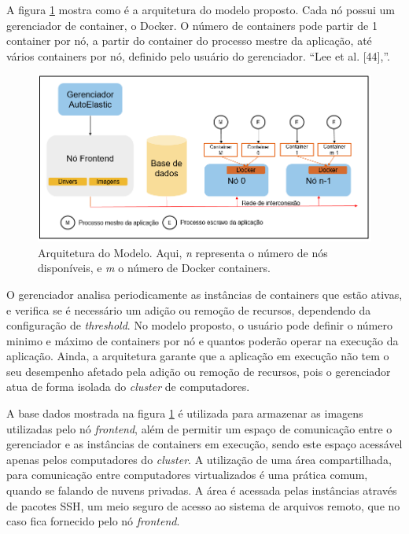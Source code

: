 \documentclass[twoside,english,brazilian]{UNISINOSartigo}
\begin{document}
A figura \ref{fig:arquitetura} mostra como é a arquitetura do modelo proposto. Cada nó possui um gerenciador de container, o Docker. O número de containers pode partir de 1 container por nó, a partir do container do processo mestre da aplicação, até vários containers por nó, definido pelo usuário do gerenciador. ``Lee
et al. [44],''.  

\begin{figure}
	\caption{Arquitetura do Modelo. Aqui, \textit{n} representa o número de nós disponíveis, e \textit{m} o número de Docker containers.}
	\label{fig:arquitetura}
	\centering%
	\begin{minipage}{0.8\textwidth}
		\includegraphics[width=\textwidth]{arquitetura}
	\end{minipage}
\end{figure}

O gerenciador analisa periodicamente as instâncias de containers que estão ativas, e verifica se é necessário um adição ou remoção de recursos, dependendo da configuração de \textit{threshold}. No modelo proposto, o usuário pode definir o número minimo e máximo de containers por nó e quantos poderão operar na execução da aplicação. Ainda, a arquitetura garante que a aplicação em execução não tem o seu desempenho afetado pela adição ou remoção de recursos, pois o gerenciador atua de forma isolada do \textit{cluster} de computadores. 

A base dados mostrada na figura \ref{fig:arquitetura} é utilizada para armazenar as imagens utilizadas pelo nó \textit{frontend}, além de permitir um espaço de comunicação entre o gerenciador e as instâncias de containers em execução, sendo este espaço acessável apenas pelos computadores do \textit{cluster}. A utilização de uma área compartilhada, para comunicação entre computadores virtualizados é uma prática comum, quando se falando de nuvens privadas. A área é acessada pelas instâncias através de pacotes SSH, um meio seguro de acesso ao sistema de arquivos remoto, que no caso fica fornecido pelo nó \textit{frontend}.
\end{document}
